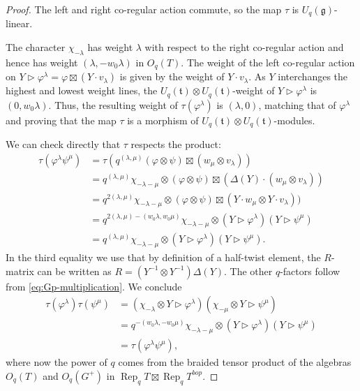\documentclass[a4paper]{article}
\numberwithin{equation}{section}
\newcommand{\1}{{\mathrm{1}\mkern-4mu{\mathchoice{}{}{\mskip-0.5mu}{\mskip-1mu}}\mathrm{l}}}
\DeclareMathOperator{\Rep}{Rep}
\renewcommand{\t}{\mathfrak{t}}
\newcommand{\g}{\mathfrak{g}}
\begin{document}
\begin{proof}
The left and right co-regular action commute, so the map $\tau$ is $U_q(\g)$-linear.

The character $\chi_{-\lambda}$ has weight $\lambda$ with respect to the right co-regular action and hence has weight $(\lambda,-w_0\lambda)$ in $O_q(T)$.
The weight of the left co-regular action on $Y \rhd \varphi^\lambda = \varphi \boxtimes (Y\cdot v_\lambda)$ is given by the weight of $Y\cdot v_\lambda$. As $Y$ interchanges the highest and lowest weight lines, the $U_q(\t) \otimes U_q(\t)$-weight of $Y \rhd \varphi^\lambda$ is $(0, w_0\lambda)$. Thus, the resulting weight of $\tau(\varphi^\lambda)$ is $(\lambda,0)$, matching that of $\varphi^\lambda$ and proving that the map $\tau$ is a morphism of $U_q(\t) \otimes U_q(\t)$-modules.

We can check directly that $\tau$ respects the product:
\begin{equation}
    \begin{aligned}
    \tau(\varphi^\lambda\psi^\mu) &= \tau(q^{(\lambda,\mu)}(\varphi \otimes \psi)\boxtimes (w_\mu \otimes v_\lambda))
    \\
    &= q^{(\lambda,\mu)}\chi_{-\lambda-\mu}\otimes(\varphi \otimes \psi)\boxtimes (\Delta(Y)\cdot(w_\mu \otimes v_\lambda))\\
    &= q^{2(\lambda,\mu)}\chi_{-\lambda-\mu}\otimes(\varphi \otimes \psi)\boxtimes (Y\cdot w_\mu \otimes Y\cdot v_\lambda))\\
    &= q^{2(\lambda,\mu)-(w_0\lambda,w_0\mu)}\chi_{-\lambda-\mu}\otimes(Y\rhd \varphi^\lambda)( Y\rhd \psi^\mu)\\
    &= q^{(\lambda,\mu)}\chi_{-\lambda-\mu}\otimes(Y\rhd \varphi^\lambda)( Y\rhd \psi^\mu).
\end{aligned}
\end{equation}
In the third equality we use that by definition of a half-twist element, the $R$-matrix can be written as $R = (Y^{-1}\otimes Y^{-1})\Delta(Y)$. The other $q$-factors follow from \eqref{eq:Gp-multiplication}.
We conclude
\begin{equation}
    \begin{aligned}
    \tau(\varphi^\lambda)\tau(\psi^\mu) &=  (  \chi_{-\lambda}\otimes Y\rhd \varphi^\lambda )(\chi_{-\mu} \otimes Y\rhd \psi^\mu ) \\ 
    &= q^{-(w_0\lambda,-w_0\mu)} \chi_{-\lambda-\mu} \otimes(Y\rhd \varphi^\lambda)( Y\rhd \psi^\mu) \\
    & = \tau(\varphi^\lambda\psi^\mu),
\end{aligned}
\end{equation}
where now the power of $q$ comes from the braided tensor product of the algebras $O_q(T)$ and $O_q(G^+)$ in $ \Rep_qT \boxtimes \Rep_qT^{bop}$.
\end{proof}
\end{document}
